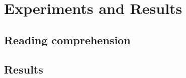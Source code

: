 \chapter{Experiments and Results}
\label{cha:china}

\section{Reading comprehension}
\label{sec:other}

\section{Results}
\label{sec:other}

